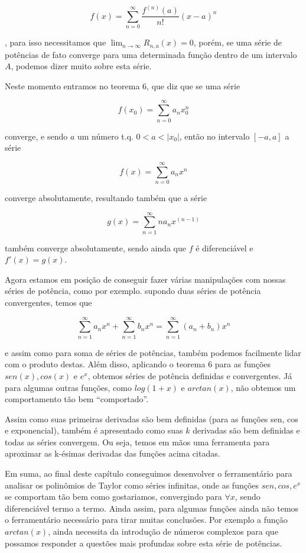 \documentclass[a4paper, 12pt]{article}
\begin{document}
\begin{equation}
	\nonumber f(x) = \sum_{n=0}^\infty \frac{f^{(n)}(a)}{n!}(x-a)^n
\end{equation}

, para isso necessitamos que $\lim_{n\to\infty}R_{n,a}(x) = 0$,
porém, se uma série de potências de fato converge para uma determinada função dentro de um intervalo
$A$, podemos dizer muito sobre esta série.

Neste momento entramos no teorema 6, que diz que se uma série

\begin{equation}
	\nonumber f(x_0) = \sum_{n=0}^\infty a_n x_0^n
\end{equation}

converge, e sendo $a$ um número t.q. $0 < a < |x_0|$, então no intervalo $[-a,a]$ a série

\begin{equation}
	\nonumber f(x) = \sum_{n=0}^\infty a_n x^n
\end{equation}

converge absolutamente, resultando também que a série

\begin{equation}
	\nonumber g(x) = \sum_{n=1}^\infty n a_n x^{(n - 1)}
\end{equation}

também converge absolutamente, sendo ainda que $f$ é diferenciável e $f'(x) = g(x)$.

Agora estamos em posição de conseguir fazer várias manipulações com nossas séries de potência, como por exemplo.
supondo duas séries de potência convergentes, temos que 

\begin{equation}
	\nonumber \sum_{n=1}^\infty a_n x^n + \sum_{n=1}^\infty b_n x^n  = \sum_{n=1}^\infty (a_n + b_n) x^n 
\end{equation}

e assim como para soma de séries de potências, também podemos facilmente lidar com o produto destas.
Além disso, aplicando o teorema 6 para as funções $sen(x), cos(x)$ e  $e^x$, obtemos séries
de potência definidas e convergentes. Já para algumas outras funções, como $log(1+x)$ e $arctan(x)$, não
obtemos um comportamento tão bem ``comportado''. 

Assim como suas primeiras derivadas são bem definidas (para as funções sen, cos e exponencial),
também é apresentado como suas $k$ derivadas são bem definidas e todas as séries convergem.
Ou seja, temos em mãos uma ferramenta para aproximar as k-ésimas derivadas das funções acima
citadas.

Em suma, ao final deste capítulo conseguimos desenvolver o ferramentário para analisar os 
polinômios de Taylor como séries infinitas, onde as funções $sen,cos,e^x$  se comportam
tão bem como gostariamos, convergindo para $\forall x$, sendo diferenciável termo a termo.
Ainda assim, para algumas funções ainda não temos o ferramentário necessário para tirar 
muitas conclusões. Por exemplo a função $arctan(x)$, ainda necessita da introdução de números 
complexos para que possamos responder a questões mais profundas sobre esta série de potências.



\newpage
\end{document}
